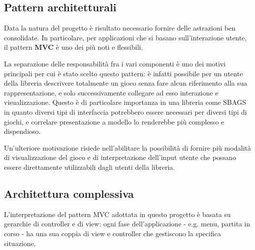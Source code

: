 
\subsection{Pattern architetturali}
Data la natura del progetto è risultato necessario fornire delle astrazioni ben consolidate.
%
In particolare, per applicazioni che si basano sull'interazione utente, il pattern \textbf{MVC} è uno dei più noti e flessibili.

La separazione delle responsabilità fra i vari componenti è uno dei motivi principali per cui è stato scelto questo pattern: è infatti possibile per un utente della libreria descrivere totalmente un gioco senza fare alcun riferimento alla sua rappresentazione, e solo successivamente collegare ad esso interazione e visualizzazione.
%
Questo è di particolare importanza in una libreria come SBAGS in quanto diversi tipi di interfaccia potrebbero essere necessari per diversi tipi di giochi, e correlare presentazione a modello lo renderebbe più complesso e dispendioso.

Un'ulteriore motivazione risiede nell'abilitare la possibilità di fornire più modalità di visualizzazione del gioco e di interpretazione dell'input utente che possano essere direttamente utilizzabili dagli utenti della libreria.


\subsection{Architettura complessiva}
L'interpretazione del pattern MVC adottata in questo progetto è basata su gerarchie di controller e di view: ogni fase dell'applicazione - e.g. menu, partita in corso - ha una sua coppia di view e controller che gestiscono la specifica situazione.

